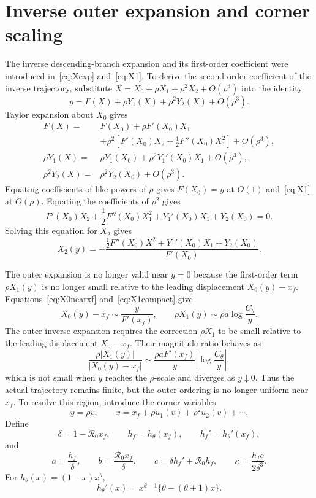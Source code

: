 \documentclass[11pt,a4paper]{article}
\newcommand{\Rzero}{\mathcal R_0}
\newcommand{\xf}{x_f}
\begin{document}
\section{Inverse outer expansion and corner scaling}
The inverse descending-branch expansion and its first-order coefficient were
introduced in~\eqref{eq:Xexp} and~\eqref{eq:X1}. To derive the second-order
coefficient of the inverse trajectory, substitute
$X=X_0+\rho X_1+\rho^2X_2+O(\rho^3)$ into the identity
\[
y=F(X)+\rho Y_1(X)+\rho^2Y_2(X)+O(\rho^3).
\]
Taylor expansion about $X_0$ gives
\begin{align*}
F(X)={}&F(X_0)+\rho F'(X_0)X_1\\
&+\rho^2\left[F'(X_0)X_2+\frac12F''(X_0)X_1^2\right]+O(\rho^3),\\
\rho Y_1(X)={}&\rho Y_1(X_0)+\rho^2Y_1'(X_0)X_1+O(\rho^3),\\
\rho^2Y_2(X)={}&\rho^2Y_2(X_0)+O(\rho^3).
\end{align*}
Equating coefficients of like powers of $\rho$ gives $F(X_0)=y$ at $O(1)$
and~\eqref{eq:X1} at $O(\rho)$. Equating the coefficients of $\rho^2$ gives
\[
F'(X_0)X_2+\frac12F''(X_0)X_1^2
+Y_1'(X_0)X_1+Y_2(X_0)=0.
\]
Solving this equation for $X_2$ gives
\begin{equation}
\label{eq:X2}
X_2(y)
=-\frac{\frac12F''(X_0)X_1^2+Y_1'(X_0)X_1+Y_2(X_0)}{F'(X_0)}.
\end{equation}

The outer expansion is no longer valid near $y=0$ because the first-order term
$\rho X_1(y)$ is no longer small relative to the leading displacement
$X_0(y)-\xf$. Equations~\eqref{eq:X0nearxf} and~\eqref{eq:X1compact} give
\[
X_0(y)-\xf\sim\frac{y}{F'(\xf)},
\qquad
\rho X_1(y)\sim\rho a\log\frac{C_\theta}{y}.
\]
The outer inverse expansion requires the correction $\rho X_1$ to be small
relative to the leading displacement $X_0-\xf$. Their magnitude ratio behaves
as
\[
\frac{\rho |X_1(y)|}{|X_0(y)-\xf|}
\sim \frac{\rho aF'(\xf)}{y}
\left|\log\frac{C_\theta}{y}\right|,
\]
which is not small when $y$ reaches the $\rho$-scale and diverges as
$y\downarrow0$. Thus the actual trajectory remains finite, but the outer
ordering is no longer uniform near $\xf$. To resolve this region, introduce
the corner variables
\begin{equation}
\label{eq:corner_scale}
y=\rho v,
\qquad
x=\xf+\rho u_1(v)+\rho^2u_2(v)+\cdots.
\end{equation}
Define
\begin{equation}
\label{eq:abcd}
\delta=1-\Rzero\xf,
\qquad
h_f=h_\theta(\xf),
\qquad
h_f'=h_\theta'(\xf),
\end{equation}
and
\begin{equation}
\label{eq:abc2}
a=\frac{h_f}{\delta},
\qquad
b=\frac{\Rzero\xf}{\delta},
\qquad
c=\delta h_f'+\Rzero h_f,
\qquad
\kappa=\frac{h_fc}{2\delta^3}.
\end{equation}
For $h_\theta(x)=(1-x)x^\theta$,
\[
h_\theta'(x)=x^{\theta-1}\{\theta-(\theta+1)x\}.
\]
\end{document}
